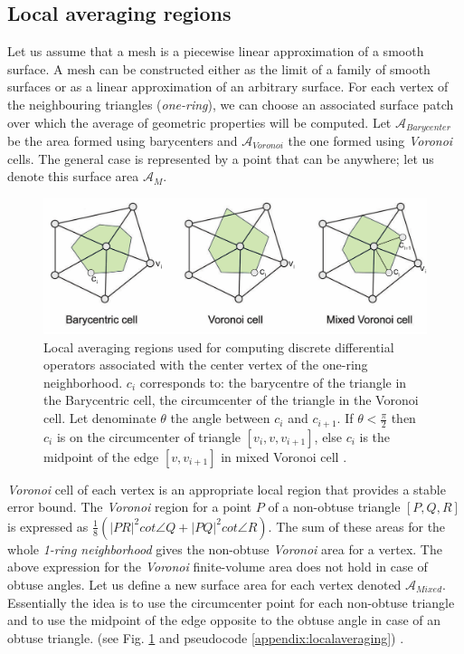\subsection{Local averaging regions} \label{section:localaveraging}
Let us assume that a mesh is a piecewise linear approximation of a smooth surface.
A mesh can be constructed either as the limit of a family of smooth surfaces or as a linear approximation of an arbitrary surface. For each vertex of the neighbouring triangles (\textit{one-ring}), we can choose an associated surface patch over which the average of geometric properties will be computed.
Let $\mathcal{A}_{Barycenter}$ be the area formed using barycenters and $\mathcal{A}_{Voronoi}$ the one formed using \textit{Voronoi} cells. The general case is represented by a point that can be anywhere; let us denote this surface area $\mathcal{A}_M$.
\begin{figure}[!h]
    \centering
    \includegraphics[scale=0.35]{images/localregions.png}
    \caption{Local averaging regions used for computing discrete differential operators associated with the center vertex of the one-ring neighborhood. $c_i$ corresponds to: the barycentre of the triangle in the Barycentric cell, the circumcenter of the triangle in the Voronoi cell. Let denominate $\theta$ the angle between $c_i$ and $c_{i+1}$. If $\theta < \frac{\pi}{2}$ then $c_i$ is on the circumcenter of triangle $[v_i, v, v_{i+1}]$, else $c_i$ is the midpoint of the edge $[v, v_{i+1}]$ in mixed Voronoi cell \cite{polygonmeshprocessing}.} \label{fig:localregions}
\end{figure}
\textit{Voronoi} cell of each vertex is an appropriate local region that provides a stable error bound.
The \textit{Voronoi} region for a point $P$ of a non-obtuse triangle $[P, Q, R]$ is expressed as $\frac{1}{8}(| PR|^2 cot \angle Q + |PQ |^2 cot \angle R)$. The sum of these areas for the whole \textit{1-ring neighborhood} gives the non-obtuse \textit{Voronoi} area for a vertex. The above expression for the \textit{Voronoi} finite-volume area does not hold in case of obtuse angles. Let us define a new surface area for each vertex denoted $\mathcal{A}_{Mixed}$. Essentially the idea is to use the circumcenter point for each non-obtuse triangle and to use the midpoint of the edge opposite to the obtuse angle in case of an obtuse triangle. (see Fig. \ref{fig:localregions} and pseudocode \ref{appendix:localaveraging}) \cite{meshlab}.

